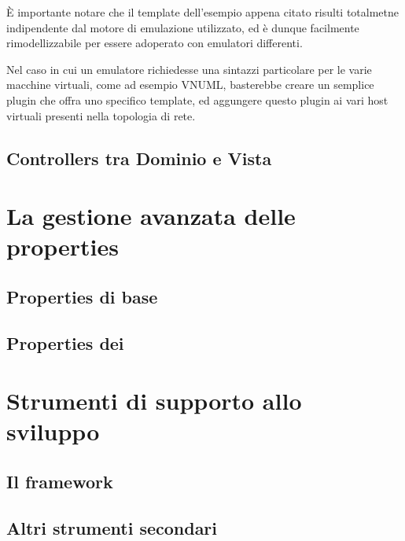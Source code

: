È importante notare che il template dell'esempio appena citato risulti totalmetne indipendente dal motore di emulazione utilizzato, ed è dunque facilmente rimodellizzabile per essere adoperato con emulatori differenti.

Nel caso in cui un emulatore richiedesse una sintazzi particolare per le varie macchine virtuali, come ad esempio VNUML, basterebbe creare un semplice plugin che offra uno specifico template, ed aggungere questo plugin ai vari host virtuali presenti nella topologia di rete.

\subsection{Controllers tra Dominio e Vista}

\section{La gestione avanzata delle properties}
\subsection{Properties di base}
\subsection{Properties dei \plugin{}}

\section{Strumenti di supporto allo sviluppo}
\subsection{Il framework \qt{}}
\subsection{Altri strumenti secondari}
